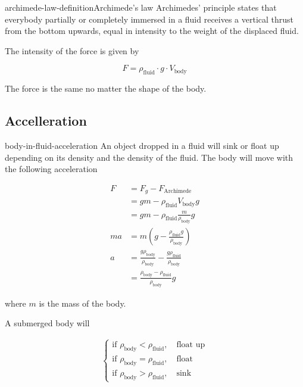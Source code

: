\documentclass[preview]{standalone}
\begin{document}
\begin{snippetdefinition}{archimede-law-definition}{Archimede's law}
    Archimedes' principle states that
    everybody partially or completely immersed in a fluid receives a
    vertical thrust from the bottom upwards,
    equal in intensity to the weight of the displaced fluid.

    The intensity of the force is given by

    \[
        F = \rho_\text{fluid} \cdot g \cdot V_\text{body}
    \]

    The force is the same no matter the shape of the body.
\end{snippetdefinition}

\subsection{Accelleration}

\begin{snippet}{body-in-fluid-acceleration}
    An object dropped in a fluid will sink or float up
    depending on its density and the density of the fluid.
    The body will move with the following acceleration

    \begin{align*}
        F &= F_g - F_\text{Archimede} \\
        &= gm - \rho_\text{fluid}V_\text{body}g \\
        &= gm - \rho_\text{fluid}\frac{m}{\rho_\text{body}}g \\
        ma &= m \left( g- \frac{\rho_\text{fluid}g}{\rho_\text{body}} \right) \\
        a &= \frac{g\rho_\text{body}}{\rho_\text{body}} - \frac{g\rho_\text{fluid}}{\rho_\text{body}} \\
        &= \frac{\rho_\text{body} - \rho_\text{fluid}}{\rho_\text{body}}g
    \end{align*}

    where \(m\) is the mass of the body.

    A submerged body will

    \begin{align*}
        \begin{cases}
            \text{if } \rho_\text{body} < \rho_\text{fluid},\quad \text{float up} \\
            \text{if } \rho_\text{body} = \rho_\text{fluid},\quad \text{float} \\
            \text{if } \rho_\text{body} > \rho_\text{fluid},\quad \text{sink}
        \end{cases}
    \end{align*}
    \phantom{}
\end{snippet}
\end{document}
